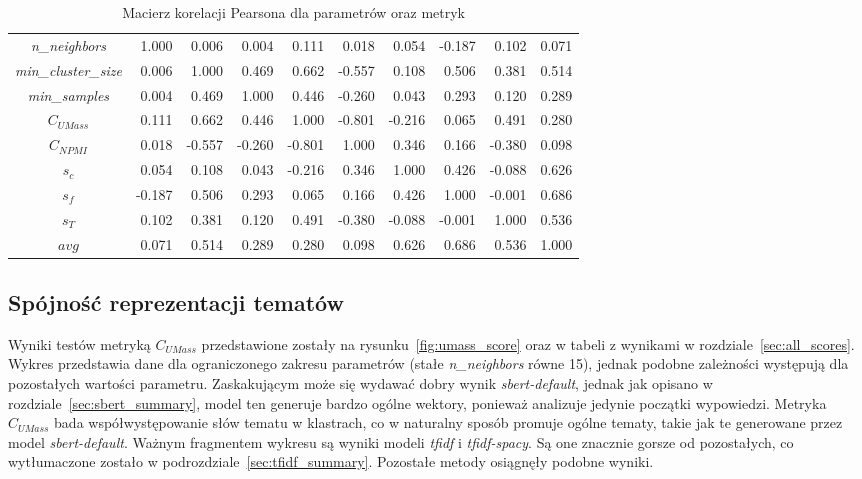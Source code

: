 	\begin{table}[htb]
		\caption{Macierz korelacji Pearsona dla parametrów oraz metryk}\label{tab:corr}
		\centering
		\small
		\begin{tabular}{c|rrrrrrrrr}	%
			\toprule
			{} &  \rotatebox[origin=c]{90}{\emph{n\_neighbors}} & \rotatebox[origin=c]{90}{\emph{min\_cluster\_size}} & \rotatebox[origin=c]{90}{\emph{min\_samples}} & \rotatebox[origin=c]{90}{\(C_{UMass}\)} & \rotatebox[origin=c]{90}{\(C_{NPMI}\)} & \rotatebox[origin=c]{90}{\(s_c\)} & \rotatebox[origin=c]{90}{\(s_f\)} & \rotatebox[origin=c]{90}{\(s_T\)} & \rotatebox[origin=c]{90}{\(avg\)} \\
			\midrule
			\emph{n\_neighbors}					&  1.000 &  0.006 &  0.004 &  0.111 &  0.018 &  0.054 & -0.187 &  0.102 &  0.071 \\
			\emph{min\_cluster\_size}		&  0.006 &  1.000 &  0.469 &  0.662 & -0.557 &  0.108 &  0.506 &  0.381 &  0.514 \\
			\emph{min\_samples}					&  0.004 &  0.469 &  1.000 &  0.446 & -0.260 &  0.043 &  0.293 &  0.120 &  0.289 \\
			\(C_{UMass}\)								&  0.111 &  0.662 &  0.446 &  1.000 & -0.801 & -0.216 &  0.065 &  0.491 &  0.280 \\
			\(C_{NPMI}\)								&  0.018 & -0.557 & -0.260 & -0.801 &  1.000 &  0.346 &  0.166 & -0.380 &  0.098 \\
			\(s_c\)											&  0.054 &  0.108 &  0.043 & -0.216 &  0.346 &  1.000 &  0.426 & -0.088 &  0.626 \\
			\(s_f\)											& -0.187 &  0.506 &  0.293 &  0.065 &  0.166 &  0.426 &  1.000 & -0.001 &  0.686 \\
			\(s_T\)											&  0.102 &  0.381 &  0.120 &  0.491 & -0.380 & -0.088 & -0.001 &  1.000 &  0.536 \\
			\(avg\)											&  0.071 &  0.514 &  0.289 &  0.280 &  0.098 &  0.626 &  0.686 &  0.536 &  1.000 \\
			\bottomrule
		\end{tabular}			
	\end{table}

	\subsection{Spójność reprezentacji tematów}
		Wyniki testów metryką \(C_{UMass}\) przedstawione zostały na rysunku~\ref{fig:umass_score} oraz w tabeli z wynikami w rozdziale~\ref{sec:all_scores}.
		Wykres przedstawia dane dla ograniczonego zakresu parametrów (stałe \emph{n\_neighbors} równe 15), jednak podobne zależności występują dla pozostałych wartości parametru.
		Zaskakującym może się wydawać dobry wynik \emph{sbert-default}, jednak jak opisano w rozdziale~\ref{sec:sbert_summary},
			model ten generuje bardzo ogólne wektory, ponieważ analizuje jedynie początki wypowiedzi.
		Metryka \(C_{UMass}\) bada współwystępowanie słów tematu w klastrach, co w naturalny sposób promuje ogólne tematy,
			takie jak te generowane przez model \emph{sbert-default}.
		Ważnym fragmentem wykresu są wyniki modeli \emph{tfidf} i \emph{tfidf-spacy}.
		Są one znacznie gorsze od pozostałych, co wytłumaczone zostało w podrozdziale~\ref{sec:tfidf_summary}.
		Pozostałe metody osiągnęły podobne wyniki.
		
